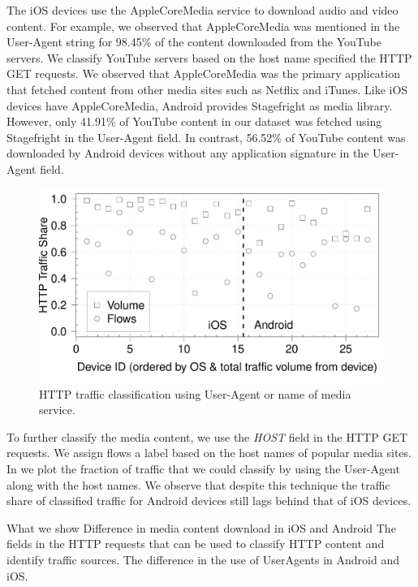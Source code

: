 The iOS devices use the AppleCoreMedia service to download audio and video content. 
For example, we observed that AppleCoreMedia was mentioned in the User-Agent string for 98.45\% of the content downloaded from the YouTube servers. 
We classify YouTube servers based on the host name specified the HTTP GET requests. 
We observed that AppleCoreMedia was the primary application that fetched content from other media sites such as Netflix and iTunes.
Like iOS devices have AppleCoreMedia, Android provides Stagefright\cite{stagefright} as media library.
However, only 41.91\% of YouTube content in our dataset was fetched using Stagefright in the User-Agent field. 
In contrast, 56.52\% of YouTube content was downloaded by Android devices without any application signature in the User-Agent field.  

\begin{figure}
\includegraphics[width=\columnwidth]{plots/appusage_someappservicesig_traffic.pdf}
\caption{HTTP traffic classification using User-Agent or name of media service.}
\label{fig:http-classification-app-service}
\end{figure}
To further classify the media content, we use the \emph{HOST} field in the HTTP GET requests.
We assign flows a label based on the host names of popular media sites. 
In  we plot the fraction of traffic that we could classify by using the User-Agent along with the host names. 
We observe that despite this technique the traffic share of classified traffic for Android devices still lags behind that of iOS devices. 

What we show
Difference in media content download in iOS and Android
The fields in the HTTP requests that can be used to classify HTTP content and identify traffic sources. 
The difference in the use of UserAgents in Android and iOS. 

